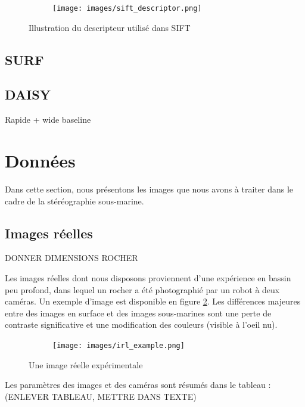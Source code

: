 \documentclass[
	a4paper, %
	10pt, %
	unnumberedsections, %
	twoside, %
]{LTJournalArticle}
\begin{document}
\begin{figure}
	\centering
	\begin{subfigure}[H]{\columnwidth}
		\centering
		\texttt{[image: images/sift\_descriptor.png]}
	\end{subfigure}
	\label{figure:sift_descriptor}
	\caption{Illustration du descripteur utilisé dans SIFT}
\end{figure}

\subsection{SURF}

\subsection{DAISY}

Rapide + wide baseline

\section{Données}

Dans cette section, nous présentons les images que nous avons à traiter dans le cadre de la stéréographie sous-marine.

\subsection{Images réelles}

DONNER DIMENSIONS ROCHER

Les images réelles dont nous disposons proviennent d'une expérience en bassin peu profond, dans lequel un rocher a été photographié par un robot à deux caméras. Un exemple d'image est disponible en figure \ref{figure:irl_example}.
Les différences majeures entre des images en surface et des images sous-marines sont une perte de contraste significative et une modification des couleurs (visible à l'oeil nu).

\begin{figure}
	\centering
	\begin{subfigure}[H]{\columnwidth}
		\centering
		\texttt{[image: images/irl\_example.png]}
	\end{subfigure}
	\label{figure:irl_example}
	\caption{Une image réelle expérimentale}
\end{figure}

Les paramètres des images et des caméras sont résumés dans le tableau  : (ENLEVER TABLEAU, METTRE DANS TEXTE)
\end{document}
